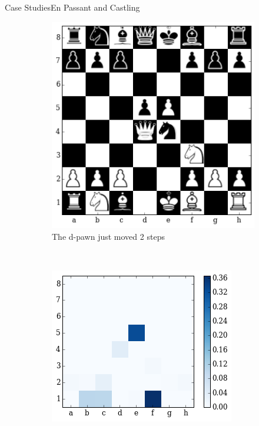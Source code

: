 \documentclass[9pt, unknownkeysallowed]{beamer}
\begin{document}
\begin{frame}{Case Studies}{En Passant and Castling}
\begin{figure}[H] 
  \centering
    \begin{subfigure}[t]{0.3\textwidth}
        \centering
        \includegraphics[width=\textwidth]{../img/best_moves/output_38_0.png}
        \caption{The d-pawn just moved 2 steps}
    \end{subfigure}
    ~
    \begin{subfigure}[t]{0.3\textwidth}
        \centering
        \includegraphics[width=\textwidth]{../img/best_moves/output_38_2.png}

\end{subfigure}
\end{figure}
\end{frame}
\end{document}
